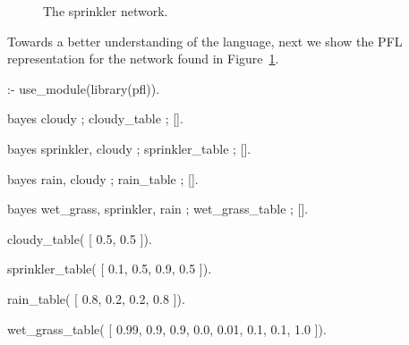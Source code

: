 \documentclass{article}
\begin{document}
\begin{figure}[t!]
\begin{center}
\caption{The sprinkler network.}
\label{fig:sprinkler-bn}
\end{center}
\end{figure}

Towards a better understanding of the language, next we show the PFL representation for the network found in Figure~\ref{fig:sprinkler-bn}.

\begin{pflcode}
:- use_module(library(pfl)).

bayes cloudy ; cloudy_table ; [].

bayes sprinkler, cloudy ; sprinkler_table ; [].

bayes rain, cloudy ; rain_table ; [].

bayes wet_grass, sprinkler, rain ; wet_grass_table ; [].

cloudy_table(
    [ 0.5,
      0.5 ]).

sprinkler_table(
    [ 0.1, 0.5,
      0.9, 0.5 ]).

rain_table(
    [ 0.8, 0.2,
      0.2, 0.8 ]).

wet_grass_table(
    [ 0.99, 0.9, 0.9, 0.0,
      0.01, 0.1, 0.1, 1.0 ]).
\end{pflcode}
\end{document}
